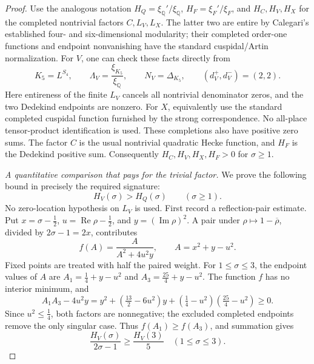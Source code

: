 \begin{proof}
Use the analogous notation \(H_Q=\xi_{\mathbb Q}'/\xi_{\mathbb Q}\),
\(H_F=\xi_F'/\xi_F\), and \(H_C,H_V,H_X\) for the completed
nontrivial factors \(C,L_V,L_X\). The latter two are entire
by Calegari's established four- and six-dimensional modularity;
their completed order-one functions and endpoint nonvanishing
have the standard cuspidal/Artin normalization. For \(V\),
one can check these facts directly from
\[
 K_5=L^{S_4},\qquad
 \Lambda_V=\frac{\xi_{K_5}}{\xi_{\mathbb Q}},\qquad
 N_V=\Delta_{K_5},\qquad (d_V^+,d_V^-)=(2,2).
 \tag{MA-RB.212}
\]
Here entireness of the finite \(L_V\) cancels all nontrivial
denominator zeros, and the two Dedekind endpoints are nonzero.
For \(X\), equivalently use the standard completed cuspidal
function furnished by the strong correspondence. No all-place
tensor-product identification is used. These completions also
have positive zero sums. The factor \(C\) is the usual
nontrivial quadratic Hecke function, and \(H_F\) is the
Dedekind positive sum. Consequently
\(H_C,H_V,H_X,H_F>0\) for \(\sigma\ge1\).

\emph{A quantitative comparison that pays for the trivial factor.}
We prove the following bound in precisely the required signature:
\[
                        H_V(\sigma)>H_Q(\sigma)
                                      \qquad(\sigma\ge1).
 \tag{MA-RB.213}
\]
No zero-location hypothesis on \(L_V\) is used.
First record a reflection-pair estimate. Put
\(x=\sigma-\tfrac12\), \(u=\operatorname{Re}\rho-\tfrac12\),
and \(y=(\operatorname{Im}\rho)^2\). A pair under
\(\rho\mapsto1-\overline\rho\), divided by \(2\sigma-1=2x\),
contributes
\[
 f(A)=\frac{A}{A^2+4u^2y},\qquad A=x^2+y-u^2.
 \tag{MA-RB.214}
\]
Fixed points are treated with half the paired weight.
For \(1\le\sigma\le3\), the endpoint values of \(A\) are
\(A_1=\tfrac14+y-u^2\) and \(A_3=\tfrac{25}4+y-u^2\).
The function \(f\) has no interior minimum, and
\[
 A_1A_3-4u^2y
    =y^2+(\tfrac{13}2-6u^2)y
          +(\tfrac14-u^2)(\tfrac{25}4-u^2)\ge0.
 \tag{MA-RB.215}
\]
Since \(u^2\le\tfrac14\), both factors are nonnegative;
the excluded completed endpoints remove the only singular
case. Thus \(f(A_1)\ge f(A_3)\), and summation gives
\[
 \frac{H_V(\sigma)}{2\sigma-1}\ge\frac{H_V(3)}5
                                      \quad(1\le\sigma\le3).
 \tag{MA-RB.216}
\]


\end{proof}
